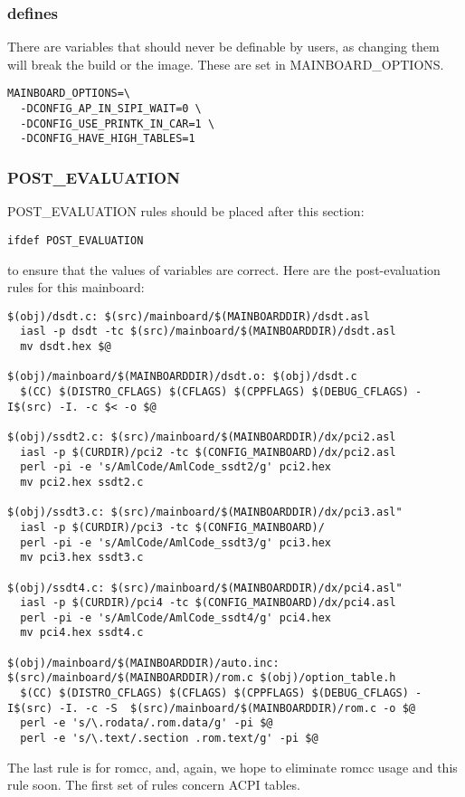 \documentclass[10pt,letterpaper]{article}
\begin{document}
\subsubsection{defines}
There are variables that should never be definable by users, as changing them will break the build or the image. These are set
in MAINBOARD\_OPTIONS.
\begin{verbatim}
MAINBOARD_OPTIONS=\
  -DCONFIG_AP_IN_SIPI_WAIT=0 \
  -DCONFIG_USE_PRINTK_IN_CAR=1 \
  -DCONFIG_HAVE_HIGH_TABLES=1
\end{verbatim}
\subsubsection{POST\_EVALUATION}
POST\_EVALUATION rules should be placed after this section:
\begin{verbatim}
ifdef POST_EVALUATION
\end{verbatim}
to ensure that the values of variables are correct.
Here are the post-evaluation rules for this mainboard:
\begin{verbatim}
$(obj)/dsdt.c: $(src)/mainboard/$(MAINBOARDDIR)/dsdt.asl
  iasl -p dsdt -tc $(src)/mainboard/$(MAINBOARDDIR)/dsdt.asl
  mv dsdt.hex $@

$(obj)/mainboard/$(MAINBOARDDIR)/dsdt.o: $(obj)/dsdt.c
  $(CC) $(DISTRO_CFLAGS) $(CFLAGS) $(CPPFLAGS) $(DEBUG_CFLAGS) -I$(src) -I. -c $< -o $@

$(obj)/ssdt2.c: $(src)/mainboard/$(MAINBOARDDIR)/dx/pci2.asl
  iasl -p $(CURDIR)/pci2 -tc $(CONFIG_MAINBOARD)/dx/pci2.asl
  perl -pi -e 's/AmlCode/AmlCode_ssdt2/g' pci2.hex
  mv pci2.hex ssdt2.c

$(obj)/ssdt3.c: $(src)/mainboard/$(MAINBOARDDIR)/dx/pci3.asl"
  iasl -p $(CURDIR)/pci3 -tc $(CONFIG_MAINBOARD)/
  perl -pi -e 's/AmlCode/AmlCode_ssdt3/g' pci3.hex
  mv pci3.hex ssdt3.c
  
$(obj)/ssdt4.c: $(src)/mainboard/$(MAINBOARDDIR)/dx/pci4.asl"
  iasl -p $(CURDIR)/pci4 -tc $(CONFIG_MAINBOARD)/dx/pci4.asl
  perl -pi -e 's/AmlCode/AmlCode_ssdt4/g' pci4.hex
  mv pci4.hex ssdt4.c

$(obj)/mainboard/$(MAINBOARDDIR)/auto.inc: $(src)/mainboard/$(MAINBOARDDIR)/rom.c $(obj)/option_table.h
  $(CC) $(DISTRO_CFLAGS) $(CFLAGS) $(CPPFLAGS) $(DEBUG_CFLAGS) -I$(src) -I. -c -S  $(src)/mainboard/$(MAINBOARDDIR)/rom.c -o $@
  perl -e 's/\.rodata/.rom.data/g' -pi $@
  perl -e 's/\.text/.section .rom.text/g' -pi $@

\end{verbatim}
The last rule is for romcc, and, again, we hope to eliminate romcc usage and this rule soon. The first set of rules concern ACPI tables.
\end{document}
